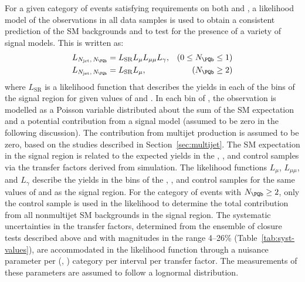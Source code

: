 For a given category of events satisfying requirements on both \njet
and \nb, a likelihood model of the observations in all data samples is
used to obtain a consistent prediction of the SM backgrounds and to
test for the presence of a variety of signal models. This is written
as:
\begin{equation}
  \label{likelihood}
  \begin{aligned}
  L_{\njet,\,\nb}  & =  L_\mathrm{SR} L_{\mu} L_{\mu\mu} L_{\gamma}, & (0 \leq \nb \leq 1) \\
  L_{\njet,\,\nb}  & =  L_\mathrm{SR} L_{\mu}, & (\nb \geq 2)
  \end{aligned}
\end{equation}
where $L_\mathrm{SR}$ is a likelihood function that describes the
yields in each of the \scalht bins of the signal region for given
values of \njet and \nb.  In each bin of \scalht, the observation is
modelled as a Poisson variable distributed about the sum of the SM
expectation and a potential contribution from a signal model (assumed
to be zero in the following discussion). The contribution from
multijet production is assumed to be zero, based on the studies
described in Section~\ref{sec:multijet}.  The SM expectation in the
signal region is related to the expected yields in the \mj, \mmj, and
\gj control samples via the transfer factors derived from
simulation. The likelihood functions $L_\mu$, $L_{\mu\mu}$, and
$L_\gamma$ describe the yields in the \scalht bins of the \mj, \mmj,
and \gj control samples for the same values of \njet and \nb as the
signal region.  For the category of events with $\nb \geq 2$, only the
\mj control sample is used in the likelihood to determine the total
contribution from all nonmultijet SM backgrounds in the signal
region. The systematic uncertainties in the transfer factors,
determined from the ensemble of closure tests described above and with
magnitudes in the range 4--26\% (Table~\ref{tab:syst-values}), are
accommodated in the likelihood function through a nuisance parameter
per (\njet, \nb) category per \scalht interval per transfer
factor. The measurements of these parameters are assumed to follow a
lognormal distribution.



